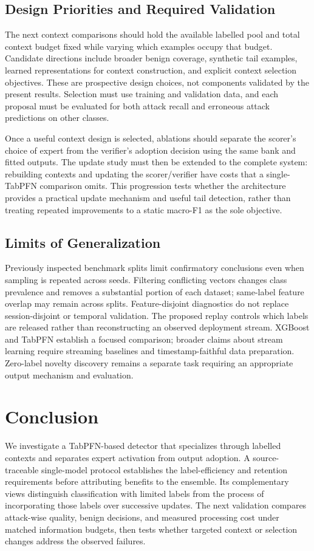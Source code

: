 \documentclass[sigconf,anonymous,pbalance]{acmart}
\begin{document}
\subsection{Design Priorities and Required Validation}
The next context comparisons should hold the available labelled pool and total context budget fixed while varying which examples occupy that budget. Candidate directions include broader benign coverage, synthetic tail examples, learned representations for context construction, and explicit context selection objectives. These are prospective design choices, not components validated by the present results. Selection must use training and validation data, and each proposal must be evaluated for both attack recall and erroneous attack predictions on other classes.

Once a useful context design is selected, ablations should separate the scorer's choice of expert from the verifier's adoption decision using the same bank and fitted outputs. The update study must then be extended to the complete system: rebuilding contexts and updating the scorer/verifier have costs that a single-TabPFN comparison omits. This progression tests whether the architecture provides a practical update mechanism and useful tail detection, rather than treating repeated improvements to a static macro-F1 as the sole objective.

\subsection{Limits of Generalization}
Previously inspected benchmark splits limit confirmatory conclusions even when sampling is repeated across seeds. Filtering conflicting vectors changes class prevalence and removes a substantial portion of each dataset; same-label feature overlap may remain across splits. Feature-disjoint diagnostics do not replace session-disjoint or temporal validation. The proposed replay controls which labels are released rather than reconstructing an observed deployment stream. XGBoost and TabPFN establish a focused comparison; broader claims about stream learning require streaming baselines and timestamp-faithful data preparation. Zero-label novelty discovery remains a separate task requiring an appropriate output mechanism and evaluation.

\section{Conclusion}
We investigate a TabPFN-based detector that specializes through labelled contexts and separates expert activation from output adoption. A source-traceable single-model protocol establishes the label-efficiency and retention requirements before attributing benefits to the ensemble. Its complementary views distinguish classification with limited labels from the process of incorporating those labels over successive updates. The next validation compares attack-wise quality, benign decisions, and measured processing cost under matched information budgets, then tests whether targeted context or selection changes address the observed failures.
\end{document}
